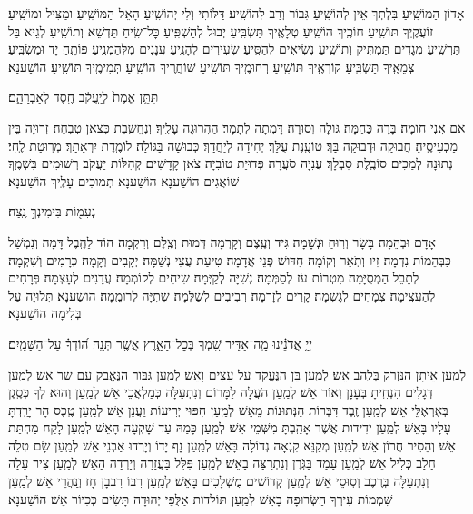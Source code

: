 \documentclass[twoside, openany, parskip=half, 11pt]{book}
\begin{document}
אָדוֹן הַמּוֹשִֽׁיעַ׃ בִּלְתְּךָ אֵין לְהוֹשִֽׁיעַ׃ גִּבּוֹר וְרַב לְהוֹשִֽׁיע׃ דַּלּוֹתִי וְלִי יְהוֹשִֽׁיעַ׃ הָאֵל הַמּוֹשִֽׁיעַ׃ וּמַצִּיל וּמוֹשִֽׁיעַ׃ זוֹעֲקֶֽיךָ תּוֹשִֽׁיעַ׃ חוֹכֶֽיךָ הוֹשִֽׁיעַ׃ טְלָאֶֽיךָ תַּשְׂבִּֽיעַ׃ יְבוּל לְהַשְׁפִּֽיעַ׃ כׇּל־שִֽׂיחַ תַּדְשֵׁא וְתוֹשִֽׁיעַ׃ לְגֵיא בַּל תַּרְשִֽׁיעַ׃ מְגָדִים תַּמְתִּיק וְתוֹשִֽׁיעַ׃ נְשִׂיאִים לְהַסִּֽיעַ׃ שְׂעִירִים לְהָנִֽיעַ׃ עֲנָנִים מִלְּהַמְנִֽיעַ׃ פּוֹתֵֽחַ יָד וּמַשְׂבִּֽיעַ׃ צְמֵאֶֽיךָ תַּשְׂבִּֽיעַ׃ קוֹרְאֶֽיךָ תּוֹשִֽׁיעַ׃ רְחוּמֶֽיךָ תּוֹשִֽׁיעַ׃
שׁוֹחֲרֶֽיךָ הוֹשִֽׁיעַ׃
תְּמִימֶֽיךָ תּוֹשִֽׁיעַ׃ הוֹשַׁענָא׃

תִּתֵּ֤ן אֱמֶת֙ לְיַֽעֲקֹ֔ב חֶ֖סֶד לְאַבְרָהָ֑ם׃


אֹם אֲנִי חוֹמָה׃ בָּרָה כַּחַמָּה׃ גּוֹלָה וְסוּרָה׃ דָּמְתָה לְתָמָר׃ הַהֲרוּגָה עָלֶֽיךָ׃ וְנֶחֱשֶֽׁבֶת כְּצֹאן טִבְחָה׃ זְרוּיָה בֵּין מַכְעִיסֶֽיהָ׃ חֲבוּקָה וּדְבוּקָה בָּךְ׃ טוֹעֶֽנֶת עֻלָּךְ׃ יְחִידָה לְיַחֲדָךְ׃ כְּבוּשָׁה בַּגּוֹלָה׃ לוֹמֶֽדֶת יִרְאָתָךְ׃ מְרֽוּטַת לֶֽחִי׃ נְתוּנָה לְמַכִים׃ סוֹבֶֽלֶת סִבְלָךְ׃ עֲנִיָּה סֹעֲרָה׃ פְּדוּיַת טוֹבִיָּה׃ צֹאן קָדָשִׁים׃ קְהִלּוֹת יַעֲקֹב׃ רְשׁוּמִים בִּשְׁמֶֽךָ׃ שׁוֹאֲגִים הוֹשַׁענָא׃ הוֹשַׁענָא תְּמוּכִים עָלֶֽיךָ הוֹשַׁענָא׃

נְעִמ֖וֹת בִּימִינְךָ֣ נֶֽצַח׃


אָדָם וּבְהֵמָה׃ בָּשָׂר וְרֽוּחַ וּנְשָׁמָה׃ גִּיד וְעֶֽצֶם וְקָרְמָה׃ דְּמוּת וְצֶֽלֶם וְרִקְמָה׃ הוֹד לַהֶֽבֶל דָּמָה׃ וְנִמְשַׁל כַּבְּהֵמוֹת נִדְמָה׃ זִיו וְתֹֽאַר וְקוֹמָה׃ חִדּוּשׁ פְּנֵי אֲדָמָה׃ טִיעַת עֲצֵי נְשַׁמָּה׃ יְקָבִים וְקָמָה׃ כְּרָמִים וְשִׁקְמָה׃ לְתֵבֵל הַמְסֻיָּמָה׃ מִטְרוֹת עֹז לְסַמְּמָה׃ נְשִׁיָּה לְקַיְּמָה׃ שִׂיחִים לְקוֹמְמָה׃ עֲדָנִים לְעָצְמָה׃ פְּרָחִים לְהַעֲצִֽימָה׃ צְמָחִים לְגָשְׁמָה׃ קָרִים לְזָרְמָה׃ רְבִיבִים לְשַׁלְּמָה׃
שְׁתִיָּה לְרוֹמֵֽמָה׃ הוֹשַׁענָא׃
תְּלוּיָה עַל בְּלִימָה הוֹשַׁענָא׃

יְיָ֤ אֲדֹנֵ֗ינוּ מָֽה־אַדִּ֣יר שִׁ֭מְךָ בְּכׇל־הָאָ֑רֶץ אֲשֶׁ֥ר תְּנָ֥ה ה֝וֹדְךָ֗ עַל־הַשָּׁמָֽיִם׃


לְמַֽעַן אֵיתָן הַנִּזְרַק בְּלַֽהַב אֵשׁ׃ לְמַֽעַן בֵּן הַנֶּעֱקַד עַל עֵצִים וָאֵשׁ׃ לְמַֽעַן גִּבּוֹר הַנֶּאֱבַק עִם שַׂר אֵשׁ׃ לְמַֽעַן דְּגָלִים הִנְחִֽיתָ בְּעָנָן וְאוֹר אֵשׁ׃ לְמַֽעַן הֹעֲלָה לַמָּרוֹם וְנִתְעַלָּה כְּמַלְאֲכֵי אֵשׁ׃ לְמַֽעַן וְהוּא לְךָ כְּסֶֽגֶן בְּאֶרְאֶלֵּי אֵשׁ׃ לְמַֽעַן זֶֽבֶד דִּבְּרוֹת הַנְּתוּנוֹת מֵאֵשׁ לְמַֽעַן חִפּוּי יְרִיעוֹת וַעֲנַן אֵשׁ׃ לְמַֽעַן טֶֽכֶס הָר יָרַֽדְתָּ עָלָיו בָּאֵשׁ׃ לְמַֽעַן יְדִידוּת אֲשֶׁר אָהַֽבְתָּ מִשְּׁמֵי אֵשׁ׃ לְמַֽעַן כָּמַהּ עַד שָׁקְעָה הָאֵשׁ לְמַֽעַן לָקַח מַחְתַּת אֵשׁ׃ וְהֵסִיר חֲרוֹן אֵשׁ׃ לְמַֽעַן מְקַנֵּא קִנְאָה גְדוֹלָה בָּאֵשׁ לְמַֽעַן נָף יָדוֹ וְיָרְדוּ אַבְנֵי אֵשׁ׃ לְמַֽעַן שָׂם טְלֵה חָלָב כְּלִיל אֵשׁ׃ לְמַֽעַן עָמַד בַּגֹּֽרֶן וְנִתְרַצָּה בָאֵשׁ׃ לְמַֽעַן פִּלֵּל בָּעֲזָרָה וְיָרְדָה הָאֵשׁ׃ לְמַֽעַן צִיר עָלָה וְנִתְעַלָּה בְּרֶֽכֶב וְסֽוּסֵי אֵשׁ׃ לְמַֽעַן קְדוֹשִׁים מֻשְׁלָכִים בָּאֵשׁ׃ לְמַֽעַן רִבּוֹ רִבְבָן חָז וְנַֽהֲרֵי אֵשׁ׃
לְמַֽעַן שִׁמְמוֹת עִירְךָ הַשְּׂרוּפָה בָאֵשׁ׃
לְמַֽעַן תּוֹלְדוֹת אַלֻּפֵי יְהוּדָה תָּשִׂים כְּכִיּוֹר אֵשׁ׃ הוֹשַׁענָא׃
\end{document}
